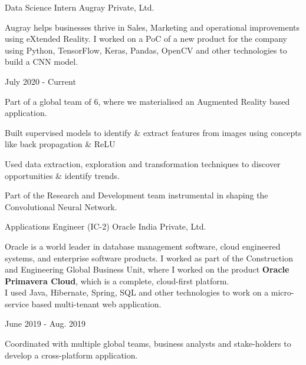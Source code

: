 \begin{cventries}
  \cvexperience
    {Data Science Intern}
    {Augray Private, Ltd.}
    {}
    {
    \begin{cvitems}
    \hspace{-2ex}
        Augray helps businesses thrive in Sales, Marketing and operational improvements using eXtended Reality. I worked on a PoC of a new product for the company using Python, TensorFlow, Keras, Pandas, OpenCV and other technologies to build a CNN model.
    \end{cvitems}
    \vspace{-2ex}
    }
    {July 2020 - Current}
    {
      \begin{cvitems}
        \item {Part of a global team of 6, where we materialised an Augmented Reality based application.}
        \item {Built supervised models to identify \& extract features from images using concepts like back propagation \& ReLU}
        \item {Used data extraction, exploration and transformation techniques to discover opportunities \& identify trends.}
        \item {Part of the Research and Development team instrumental in shaping the Convolutional Neural Network.}
      \end{cvitems}
    }
  \cvexperience
    {Applications Engineer (IC-2)}
    {Oracle India Private, Ltd.}
    {}
    {
    \begin{cvitems}
    \hspace{-2ex}
        Oracle is a world leader in database management software, cloud engineered systems, and enterprise software products. I worked as part of the Construction and Engineering Global Business Unit, where I worked on the product \textbf{Oracle Primavera Cloud}, which is a complete, cloud-first platform.\\
        I used Java, Hibernate, Spring, SQL and other technologies to work on a micro-service based multi-tenant web application.
    \end{cvitems}
    \vspace{-2ex}
    }
    {June 2019 - Aug. 2019}
    {
      \begin{cvitems}
        \item {Coordinated with multiple global teams, business analysts and stake-holders to develop a cross-platform application.}

\end{cvitems}}
\end{cventries}
